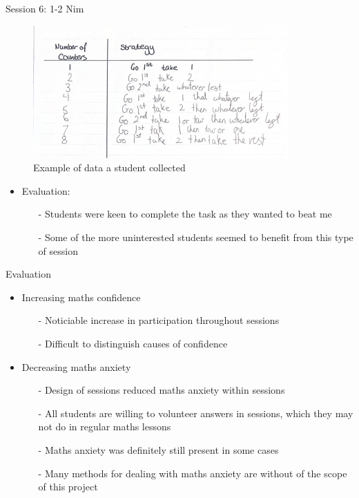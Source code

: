 \documentclass{beamer}  %
\begin{document}
\begin{frame}{Session 6: 1-2 Nim}
    \begin{figure}
        \includegraphics[scale = 0.6]{Images/1-2Nim.png}
        \caption{Example of data a student collected}
    \end{figure} 
            \begin{itemize}
                \item Evaluation:
                \begin{itemize}
                    \item[-] Students were keen to complete the task as they wanted to beat me
                    \item[-] Some of the more uninterested students seemed to benefit from this type of session
                \end{itemize}
            \end{itemize}

\end{frame}

\begin{frame}{Evaluation}
    \begin{itemize}
        \item Increasing maths confidence
        \begin{itemize}
            \item[-] Noticiable increase in participation throughout sessions
            \item[-] Difficult to distinguish causes of confidence
        \end{itemize}
        \item Decreasing maths anxiety
        \begin{itemize}
            \item[-] Design of sessions reduced maths anxiety within sessions
            \item[-] All students are willing to volunteer answers in sessions, which they may not do in regular maths lessons
            \item[-] Maths anxiety was definitely still present in some cases 
            \item[-] Many methods for dealing with maths anxiety are without of the scope of this project
        \end{itemize}
    \end{itemize}


\end{frame}
\end{document}
